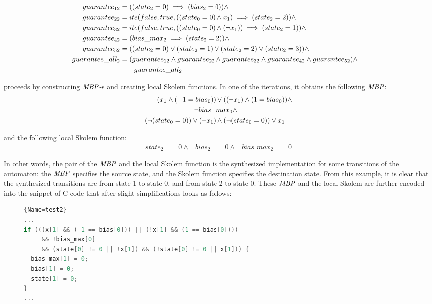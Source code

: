 \begin{equation}
\begin{aligned}
  guarantee_{12}&=((state_2=0)\implies (bias_2=0)) \land\\
  guarantee_{22}&=ite(false, true, ((state_0=0)\land x_1)\implies (state_2=2)) \land\\
  guarantee_{32}&=ite(false, true, ((state_0=0)\land (\neg x_1))\implies (state_2=1)) \land\\
  guarantee_{42}&=(bias\_max_2\implies (state_2=2)) \land\\
  guarantee_{52}&=((state_2=0) \lor (state_2=1) \lor (state_2=2) \lor (state_2=3))\land \\
  guarantee\_all_2&=(guarantee_{12}\land guarantee_{22}\land guarantee_{32}\land guarantee_{42} \land guarantee_{52})\land \\
  &\qquad {} guarantee\_all_2&\notag
\end{aligned}
\end{equation}

\aeval proceeds by constructing $\mathit{MBP}$-s and creating local Skolem functions. 
In one of the iterations, it obtains the following $\mathit{MBP}$:%
\begin{equation}
\begin{aligned}
  (x_1\land (-1=bias_0)) &\lor ((\neg x_1)\land (1=bias_0)) \land \\
  \neg bias\_&max_0 \land \\
  (\neg (state_0=0))\lor (\neg x_1) &\land
  (\neg (state_0=0))\lor x_1  \notag
\end{aligned}
\end{equation}

and the following local Skolem function:%
\begin{align*}
  state_2&=0 \land&
  bias_2&=0 \land&
  bias\_max_2&=0
\end{align*}

In other words, the pair of the $\mathit{MBP}$ and the local Skolem function is the synthesized implementation for some transitions of the automaton: the $\mathit{MBP}$ specifies the source state, and the Skolem function specifies the destination state.
From this example, it is clear that the synthesized transitions are from state 1 to state 0, and from state 2 to state 0.
These $\mathit{MBP}$ and the local Skolem are further encoded into the snippet of C code that after slight simplifications looks as follows:

\begin{figure}[h]
\begin{lstlisting}[language=C]{Name=test2}
...
if (((x[1] && (-1 == bias[0])) || (!x[1] && (1 == bias[0])))
     && !bias_max[0] 
     && (state[0] != 0 || !x[1]) && (!state[0] != 0 || x[1])) {
  bias_max[1] = 0;
  bias[1] = 0;
  state[1] = 0;
}
...
\end{lstlisting}
\end{figure}